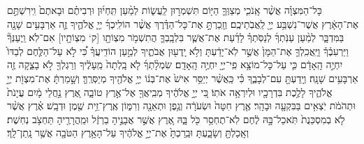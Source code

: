 \documentclass[twoside, openany, parskip=half, 11pt]{book}
\begin{document}
\begin{footnotesize}
\begin{multicols}{2}
כָּל־הַמִּצְוָ֗ה אֲשֶׁ֨ר אָֽנֹכִ֧י מְצַוְּךָ֛ הַיּ֖וֹם תִּשְׁמְר֣וּן לַֽעֲשׂ֑וֹת לְמַ֨עַן תִּֽחְי֜וּן וּרְבִיתֶ֗ם וּבָאתֶם֙ וִֽירִשְׁתֶּ֣ם אֶת־הָאָ֔רֶץ אֲשֶׁר־נִשְׁבַּ֥ע יְיָ֖ לַֽאֲבֹֽתֵיכֶֽם׃ וְזָֽכַרְתָּ֣ אֶת־כָּל־הַדֶּ֗רֶךְ אֲשֶׁ֨ר הוֹלִֽיכְךָ֜ יְיָ֧ אֱלֹהֶ֛יךָ זֶ֛ה אַרְבָּעִ֥ים שָׁנָ֖ה בַּמִּדְבָּ֑ר לְמַ֨עַן עַנֹּֽתְךָ֜ לְנַסֹּֽתְךָ֗ לָדַ֜עַת אֶת־אֲשֶׁ֧ר בִּלְבָֽבְךָ֛ הֲתִשְׁמֹ֥ר מִצְוֹתָ֖ו [ק‘ מִצְוֹתָ֖יו] אִם־לֹֽא׃ וַֽיְעַנְּךָ֘ וַיַּרְעִבֶ֒ךָ֒ וַיַּֽאֲכִֽלְךָ֤ אֶת־הַמָּן֙ אֲשֶׁ֣ר לֹֽא־יָדַ֔עְתָּ וְלֹ֥א יָֽדְע֖וּן אֲבֹתֶ֑יךָ לְמַ֣עַן הוֹדִֽיעֲךָ֗ כִּ֠י לֹ֣א עַל־הַלֶּ֤חֶם לְבַדּוֹ֙ יִחְיֶ֣ה הָֽאָדָ֔ם כִּ֛י עַל־כָּל־מוֹצָ֥א פִֽי־יְיָ֖ יִחְיֶ֥ה הָֽאָדָֽם׃  שִׂמְלָ֨תְךָ֜ לֹ֤א בָֽלְתָה֙ מֵֽעָלֶ֔יךָ וְרַגְלְךָ֖ לֹ֣א בָצֵ֑קָה זֶ֖ה אַרְבָּעִ֥ים שָׁנָֽה׃ וְיָֽדַעְתָּ֖ עִם־לְבָבֶ֑ךָ כִּ֗י כַּֽאֲשֶׁ֨ר יְיַסֵּ֥ר אִישׁ֙ אֶת־בְּנ֔וֹ יְיָ֥ אֱלֹהֶ֖יךָ מְיַסְּרֶֽךָּ׃ וְשָׁ֣מַרְתָּ֔ אֶת־מִצְוֹ֖ת יְיָ֣ אֱלֹהֶ֑יךָ לָלֶ֥כֶת בִּדְרָכָ֖יו וּלְיִרְאָ֥ה אֹתֽוֹ׃ כִּ֚י יְיָ֣ אֱלֹהֶ֔יךָ מְבִֽיאֲךָ֖ אֶל־אֶ֣רֶץ טוֹבָ֑ה אֶ֚רֶץ נַ֣חֲלֵי מָ֔יִם עֲיָנֹת֙ וּתְהֹמֹ֔ת יֹֽצְאִ֥ים בַּבִּקְעָ֖ה וּבָהָֽר׃ אֶ֤רֶץ חִטָּה֙ וּשְׂעֹרָ֔ה וְגֶ֥פֶן וּתְאֵנָ֖ה וְרִמּ֑וֹן אֶֽרֶץ־זֵ֥ית שֶׁ֖מֶן וּדְבָֽשׁ׃ אֶ֗רֶץ אֲשֶׁ֨ר לֹ֤א בְמִסְכֵּנֻת֙ תֹּֽאכַל־בָּ֣הּ לֶ֔חֶם לֹֽא־תֶחְסַ֥ר כֹּ֖ל בָּ֑הּ אֶ֚רֶץ אֲשֶׁ֣ר אֲבָנֶ֣יהָ בַרְזֶ֔ל וּמֵֽהֲרָרֶ֖יהָ תַּחְצֹ֥ב נְחֽשֶׁת׃ וְאָֽכַלְתָּ֖ וְשָׂבָ֑עְתָּ וּבֵֽרַכְתָּ֙ אֶת־יְיָ֣ אֱלֹהֶ֔יךָ עַל־הָאָ֥רֶץ הַטֹּבָ֖ה אֲשֶׁ֥ר נָֽתַן־לָֽךְ׃


\end{multicols}
\end{footnotesize}
\end{document}
